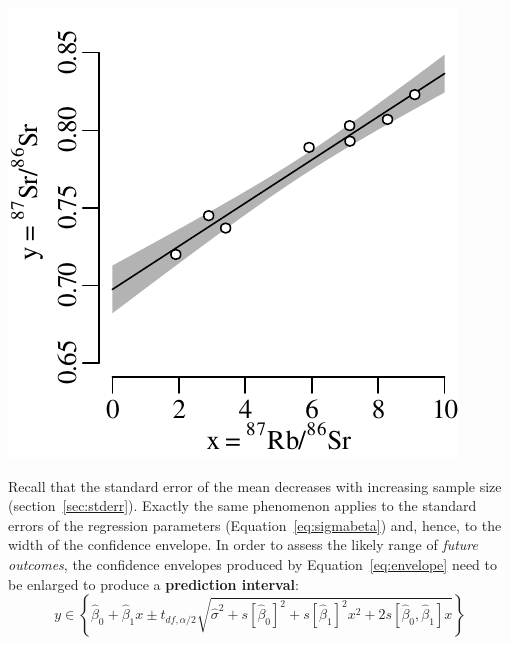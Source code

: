 \noindent\begin{minipage}[t][][b]{.33\textwidth}
  \includegraphics[width=\textwidth]{../figures/envelope.pdf}\\
\end{minipage}
\begin{minipage}[t][][t]{.67\textwidth}
  \label{fig:envelope}
\end{minipage}

Recall that the standard error of the mean decreases with increasing
sample size (section~\ref{sec:stderr}). Exactly the same phenomenon
applies to the standard errors of the regression parameters
(Equation~\ref{eq:sigmabeta}) and, hence, to the width of the
confidence envelope. In order to assess the likely range of
\emph{future outcomes}, the confidence envelopes produced by
Equation~\ref{eq:envelope} need to be enlarged to produce a
\textbf{prediction interval}:
\begin{equation}
  y \in \left\{\hat{\beta}_0 + \hat{\beta}_1 x \pm t_{df,\alpha/2}
  \sqrt{\hat{\sigma}^2 + s[\hat{\beta}_0]^2 + s[\hat{\beta}_1]^2 x^2 +
    2 s[\hat{\beta}_0,\hat{\beta}_1]x} \right\}
  \label{eq:prediction-interval}
\end{equation}

